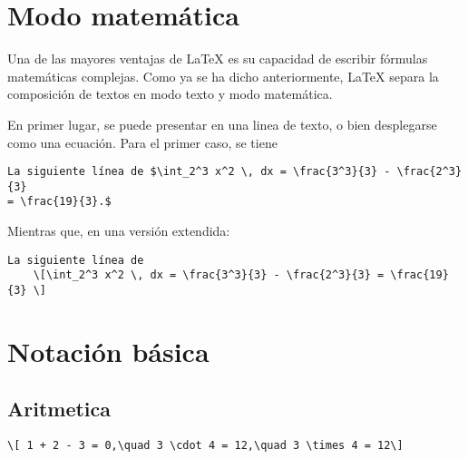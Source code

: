 \documentclass[../notes.tex]{subfiles}
\begin{document}
    \section{Modo matemática}
        Una de las mayores ventajas de {\LaTeX} es su capacidad de escribir fórmulas matemáticas complejas. Como ya se ha dicho anteriormente, {\LaTeX} separa la composición de textos en modo texto y modo matemática.
        
        En primer lugar, se puede presentar en una linea de texto, o bien desplegarse como una ecuación. Para el primer caso, se tiene
            
            \begin{Verbatim}[frame=single,fontsize=\small,label=Input]
La siguiente línea de $\int_2^3 x^2 \, dx = \frac{3^3}{3} - \frac{2^3}{3} 
= \frac{19}{3}.$
            \end{Verbatim}
            
        Mientras que, en una versión extendida:
        
            \begin{Verbatim}[frame=single,fontsize=\small,label=Input]
La siguiente línea de
    \[\int_2^3 x^2 \, dx = \frac{3^3}{3} - \frac{2^3}{3} = \frac{19}{3} \]
            \end{Verbatim}
        
        
    \section{Notación básica}
        \subsection{Aritmetica}
            \begin{Verbatim}[frame=single,fontsize=\small,label=Input]
\[ 1 + 2 - 3 = 0,\quad 3 \cdot 4 = 12,\quad 3 \times 4 = 12\]
            \end{Verbatim}
\end{document}
